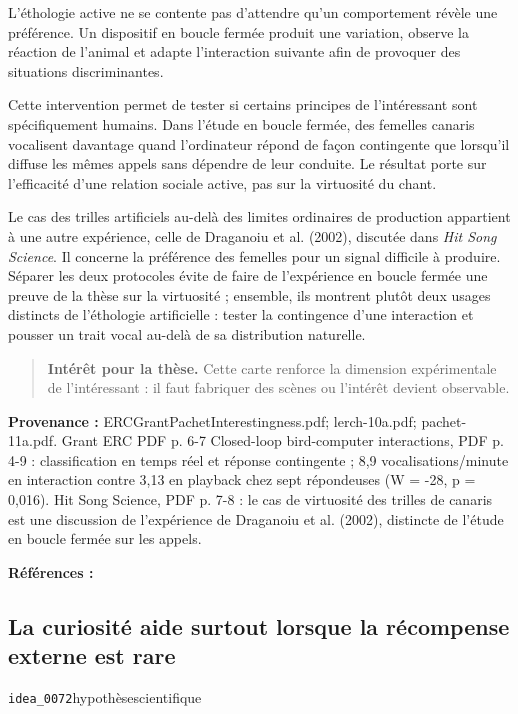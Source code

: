 \documentclass[10pt,a4paper]{article}
\begin{document}
L'éthologie active ne se contente pas d'attendre qu'un comportement révèle une préférence. Un dispositif en boucle fermée produit une variation, observe la réaction de l'animal et adapte l'interaction suivante afin de provoquer des situations discriminantes.

Cette intervention permet de tester si certains principes de l'intéressant sont spécifiquement humains. Dans l'étude en boucle fermée, des femelles canaris vocalisent davantage quand l'ordinateur répond de façon contingente que lorsqu'il diffuse les mêmes appels sans dépendre de leur conduite. Le résultat porte sur l'efficacité d'une relation sociale active, pas sur la virtuosité du chant.

Le cas des trilles artificiels au-delà des limites ordinaires de production appartient à une autre expérience, celle de Draganoiu et al. (2002), discutée dans \emph{Hit Song Science}. Il concerne la préférence des femelles pour un signal difficile à produire. Séparer les deux protocoles évite de faire de l'expérience en boucle fermée une preuve de la thèse sur la virtuosité ; ensemble, ils montrent plutôt deux usages distincts de l'éthologie artificielle : tester la contingence d'une interaction et pousser un trait vocal au-delà de sa distribution naturelle.

\begin{quote}
\textbf{Intérêt pour la thèse.} Cette carte renforce la dimension expérimentale de l'intéressant : il faut fabriquer des scènes ou l'intérêt devient observable.
\end{quote}
{\footnotesize\color{metadata}\textbf{Provenance :} ERCGrantPachetInterestingness.pdf; lerch-10a.pdf; pachet-11a.pdf. Grant ERC PDF p. 6-7 Closed-loop bird-computer interactions, PDF p. 4-9 : classification en temps réel et réponse contingente ; 8,9 vocalisations/minute en interaction contre 3,13 en playback chez sept répondeuses (W = -28, p = 0,016). Hit Song Science, PDF p. 7-8 : le cas de virtuosité des trilles de canaris est une discussion de l'expérience de Draganoiu et al. (2002), distincte de l'étude en boucle fermée sur les appels.\par}
{\footnotesize\color{metadata}\textbf{Références :} \parencite{lerch2011closedloop,pachet2011hitsong}\par}

\subsection{La curiosité aide surtout lorsque la récompense externe est rare}
{\small\color{metadata} \texttt{idea\_0072}\quad\textbullet\quad hypothèse\quad\textbullet\quad scientifique\par}
\end{document}
